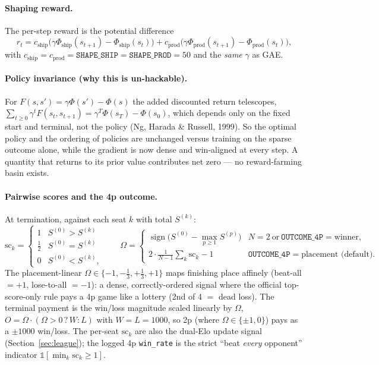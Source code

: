 \documentclass[11pt]{article}
\newcommand{\sign}{\operatorname{sign}}
\newcommand{\cd}[1]{\texttt{#1}}
\begin{document}
\paragraph{Shaping reward.} The per-step reward is the potential difference
\begin{equation}
r_t=c_{\mathrm{ship}}\big(\gamma\Phi_{\mathrm{ship}}(s_{t+1})-\Phi_{\mathrm{ship}}(s_t)\big)
   +c_{\mathrm{prod}}\big(\gamma\Phi_{\mathrm{prod}}(s_{t+1})-\Phi_{\mathrm{prod}}(s_t)\big),
\label{eq:shape}
\end{equation}
with $c_{\mathrm{ship}}=c_{\mathrm{prod}}=\cd{SHAPE\_SHIP}=\cd{SHAPE\_PROD}=50$ and the \emph{same}
$\gamma$ as GAE.

\paragraph{Policy invariance (why this is un-hackable).} For $F(s,s')=\gamma\Phi(s')-\Phi(s)$ the added
discounted return telescopes, $\sum_{t\ge0}\gamma^tF(s_t,s_{t+1})=\gamma^T\Phi(s_T)-\Phi(s_0)$, which
depends only on the fixed start and terminal, not the policy (Ng, Harada \& Russell, 1999). So the
optimal policy and the ordering of policies are unchanged versus training on the sparse outcome alone,
while the gradient is now dense and win-aligned at every step. A quantity that returns to its prior value
contributes net zero --- no reward-farming basin exists.

\paragraph{Pairwise scores and the 4p outcome.} At termination, against each seat $k$ with total
$S^{(k)}$:
\begin{equation}
\mathrm{sc}_k=\begin{cases}1 & S^{(0)}>S^{(k)}\\\tfrac12 & S^{(0)}=S^{(k)}\\0 & S^{(0)}<S^{(k)},\end{cases}
\qquad
\Omega=\begin{cases}
\sign\!\big(S^{(0)}-\max_{p\ge1}S^{(p)}\big) & N{=}2\ \text{or}\ \cd{OUTCOME\_4P}{=}\text{winner},\\[4pt]
2\cdot\tfrac1{N-1}\sum_k\mathrm{sc}_k-1 & \cd{OUTCOME\_4P}{=}\text{placement (default)}.
\end{cases}
\label{eq:outcome}
\end{equation}
The placement-linear $\Omega\in\{-1,-\tfrac13,+\tfrac13,+1\}$ maps finishing place affinely (beat-all
$=+1$, lose-to-all $=-1$): a dense, correctly-ordered signal where the official top-score-only rule pays a
4p game like a lottery (2nd of 4 $=$ dead loss). The terminal payment is the win/loss magnitude scaled
linearly by $\Omega$, $O=\Omega\cdot(\Omega>0\,?\,W:L)$ with $W{=}L{=}1000$, so 2p (where
$\Omega\in\{\pm1,0\}$) pays as a $\pm1000$ win/loss. The per-seat $\mathrm{sc}_k$ are also the dual-Elo
update signal (Section~\ref{sec:league}); the logged 4p \cd{win\_rate} is the strict ``beat
\emph{every} opponent'' indicator $\mathbb 1[\min_k\mathrm{sc}_k\ge1]$.
\end{document}
